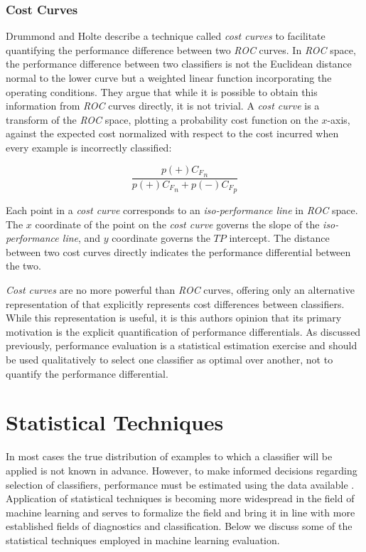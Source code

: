 \documentclass[10pt]{unbthesis}
\begin{document}
\subsubsection{Cost Curves}
Drummond and Holte \cite{RefWorks:52} describe a technique called
\textit{cost curves} to facilitate quantifying the performance
difference between two \textit{ROC} curves. In \textit{ROC} space, the
performance difference between two classifiers is not the Euclidean
distance normal to the lower curve but a weighted linear function
incorporating the operating conditions. They argue that while it
is possible to obtain this information from \textit{ROC} curves
directly, it is not trivial. A \textit{cost curve} is a transform of
the \textit{ROC} space, plotting a probability cost function on the
\(x\)-axis, against the expected cost normalized with respect to the
cost incurred when every example is incorrectly classified:

\begin{equation}
\label{equ:probcostfunc}
\frac{p(+){C_F}_n}{p(+){C_F}_n + p(-){C_F}_p}
\end{equation}

Each point in a \textit{cost curve} corresponds to an
\textit{iso-performance line} in \textit{ROC} space. The
\(x\) coordinate of the point on the \textit{cost curve} governs the slope of the
\textit{iso-performance line}, and \(y\) coordinate governs the
\(TP\) intercept. The distance between two cost curves directly
indicates the performance differential between the two.

\textit{Cost curves} are no more powerful than \textit{ROC} curves,
offering only an alternative representation of that explicitly
represents cost differences between classifiers. While this
representation is useful, it is this authors opinion that its primary
motivation is the explicit quantification of performance
differentials. As discussed previously, performance evaluation is a
statistical estimation exercise and should be used qualitatively to
select one classifier as optimal over another, not to quantify the
performance differential. 

\section{Statistical Techniques}
In most cases the true distribution of examples to which a classifier
will be applied is not known in advance. However, to make informed decisions
regarding selection of classifiers,
performance must be estimated using the data available
\cite{RefWorks:45}. Application of statistical techniques is
becoming more widespread in the field of machine learning and serves to
formalize the field and bring it in line with more established fields
of diagnostics and classification. Below we discuss some of the
statistical techniques employed in machine learning evaluation.
\end{document}
